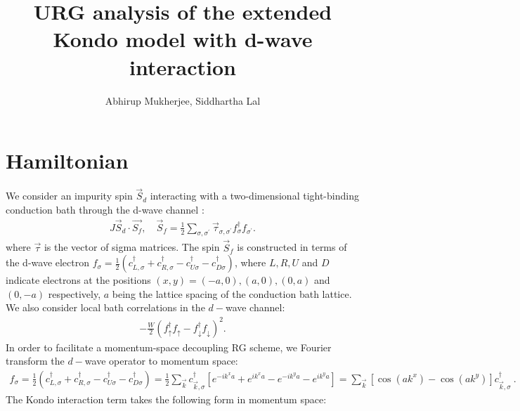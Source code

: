 \documentclass{revtex4-2}
\begin{document}
\title{URG analysis of the extended Kondo model with d-wave interaction}
\author{Abhirup Mukherjee, Siddhartha Lal}
\maketitle
\section{Hamiltonian}
We consider an impurity spin \(\vec S_d\) interacting with a two-dimensional tight-binding conduction bath through the d-wave channel :
\begin{equation}\begin{aligned}
	J \vec{S}_d\cdot\vec{S_f},\quad \vec S_f = \frac{1}{2}\sum_{\sigma,\sigma^\prime}\vec \tau_{\sigma,\sigma^\prime}f^\dagger_{\sigma}f_{\sigma^\prime}.
\end{aligned}\end{equation}
where \(\vec \tau\) is the vector of sigma matrices. The spin \(\vec S_f\) is constructed in terms of the d-wave electron \(f_{\sigma} = \frac{1}{2}\left(c^\dagger_{L,\sigma} + c^\dagger_{R,\sigma} - c^\dagger_{U\sigma} - c^\dagger_{D\sigma}\right) \), where \(L,R,U\) and \(D\) indicate electrons at the positions \((x,y)=\left(-a,0\right), \left( a,0 \right) , \left( 0,a \right) \) and \(\left( 0,-a \right) \) respectively, \(a\) being the lattice spacing of the conduction bath lattice. We also consider local bath correlations in the \(d-\)wave channel:
\begin{equation}\begin{aligned}
	-\frac{W}{2}\left(f^\dagger_{\uparrow}f_{\uparrow} - f^\dagger_{\downarrow}f_{\downarrow}\right)^2.
\end{aligned}\end{equation}
In order to facilitate a momentum-space decoupling RG scheme, we Fourier transform the \(d-\)wave operator to momentum space:
\begin{equation}\begin{aligned}
	f_{\sigma} = \frac{1}{2}\left(c^\dagger_{L,\sigma} + c^\dagger_{R,\sigma} - c^\dagger_{U\sigma} - c^\dagger_{D\sigma}\right) = \frac{1}{2}\sum_{\vec k}c^\dagger_{\vec k,\sigma}\left[e^{-ik^x a} + e^{ik^x a} - e^{-ik^y a} - e^{ik^y a}\right] =\sum_{\vec k}\left[\cos\left( ak^x \right) - \cos\left( ak^y \right) \right] c^\dagger_{\vec k,\sigma}~.
\end{aligned}\end{equation}
The Kondo interaction term takes the following form in momentum space:
\end{document}
